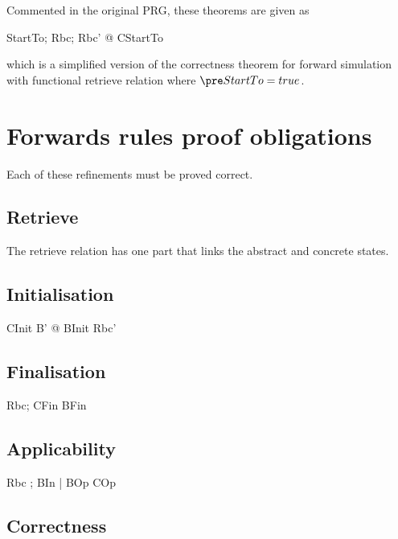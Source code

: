 Commented in the original PRG, these theorems are given as
%
\begin{gzed}
  \forall StartTo; Rbc; Rbc' @ CStartTo
\end{gzed}
%
which is a simplified version of the correctness theorem for forward
simulation with functional retrieve relation where $\pre StartTo =
true$.

\section{Forwards rules proof obligations}\label{ch15.proof-forward}

Each of these refinements must be proved correct.

\subsection{Retrieve}

The retrieve relation has one part that links the abstract and
concrete states.

\subsection{Initialisation}

\begin{gzed}
  CInit
  \shows \exists B' @ BInit \land Rbc'
\end{gzed}

\subsection{Finalisation}

\begin{gzed}
  Rbc; CFin
  \shows BFin
\end{gzed}

\subsection{Applicability}

\begin{gzed}
  Rbc ; BIn  | \pre BOp
  \shows \pre COp
\end{gzed}

\subsection{Correctness}
\label{ch25.proof-forward-correctness}

